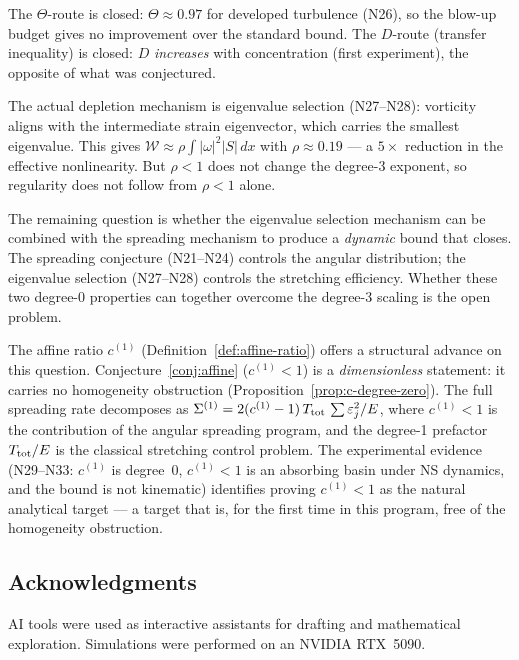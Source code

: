 \documentclass[11pt]{article}
\theoremstyle{definition}
\begin{document}
The $\Theta$-route is closed: $\Theta\approx 0.97$
for developed turbulence (N26), so the blow-up
budget gives no improvement over the standard
bound.  The $D$-route (transfer inequality) is
closed: $D$ \emph{increases} with concentration
(first experiment), the opposite of what was
conjectured.

The actual depletion mechanism is eigenvalue
selection (N27--N28): vorticity aligns with the
intermediate strain eigenvector, which carries the
smallest eigenvalue.  This gives
$\mathcal{W}\approx\rho\int|\omega|^2|S|\,dx$ with
$\rho\approx 0.19$ --- a $5\times$ reduction in the
effective nonlinearity.  But $\rho<1$ does not change
the degree-3 exponent, so regularity does not follow
from $\rho<1$ alone.

The remaining question is whether the eigenvalue
selection mechanism can be combined with the
spreading mechanism to produce a \emph{dynamic}
bound that closes.  The spreading conjecture
(N21--N24) controls the angular distribution; the
eigenvalue selection (N27--N28) controls the
stretching efficiency.  Whether these two degree-0
properties can together overcome the degree-3
scaling is the open problem.

The affine ratio $c^{(1)}$
(Definition~\ref{def:affine-ratio}) offers a
structural advance on this question.
Conjecture~\ref{conj:affine} ($c^{(1)}<1$) is a
\emph{dimensionless} statement: it carries no
homogeneity obstruction
(Proposition~\ref{prop:c-degree-zero}).  The
full spreading rate decomposes as
$\Sigma^{(1)} = 2(c^{(1)}-1)\,T_{\rm tot}\,
\sum\varepsilon_j^2/E$, where $c^{(1)}<1$ is
the contribution of the angular spreading
program, and the degree-1 prefactor
$T_{\rm tot}/E$ is the classical stretching
control problem.  The experimental evidence
(N29--N33: $c^{(1)}$ is degree~0, $c^{(1)}<1$
is an absorbing basin under NS dynamics, and
the bound is not kinematic) identifies proving
$c^{(1)}<1$ as the natural analytical target ---
a target that is, for the first time in this
program, free of the homogeneity obstruction.

\subsection*{Acknowledgments}

AI tools were used as interactive assistants for drafting
and mathematical exploration.
Simulations were performed on an NVIDIA RTX~5090.
\end{document}
